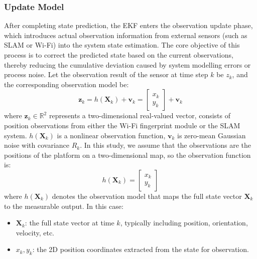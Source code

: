\documentclass[12pt,a4paper]{article}
\numberwithin{equation}{section}
\begin{document}
\subsubsection{Update Model}
After completing state prediction, the EKF enters the observation update phase,
which introduces actual observation information from external sensors (such as
SLAM or Wi-Fi) into the system state estimation. The core objective of this
process is to correct the predicted state based on the current observations,
thereby reducing the cumulative deviation caused by system modelling errors or
process noise. Let the observation result of the sensor at time step $k$ be
$z_k$, and the corresponding observation model be:
\begin{equation}
  \mathbf{z}_k = h(\mathbf{X}_k) + \mathbf{v}_k =
  \begin{bmatrix}
    x_k \\
    y_k
  \end{bmatrix} + \mathbf{v}_k
  \label{eq:observation_model}
\end{equation}
where \(\mathbf{z}_k \in \mathbb{R}^2\) represents a two-dimensional real-valued
vector, consists of position observations from either the Wi-Fi fingerprint
module or the SLAM system. $h(\mathbf{X}_k)$ is a nonlinear observation
function, $\mathbf{v}_k$ is zero-mean Gaussian noise with covariance $R_k$. In
this study, we assume that the observations are the positions of the platform on
a two-dimensional map, so the observation function is:
\begin{equation}
  h(\mathbf{X}_k) = 
  \begin{bmatrix}
    x_k \\
    y_k
  \end{bmatrix}
\end{equation}
\noindent
where $h(\mathbf{X}_k)$ denotes the observation model that maps the full state
vector $\mathbf{X}_k$ to the measurable output. In this case:
\begin{itemize}
\item $\mathbf{X}_k$: the full state vector at time $k$, typically including
  position, orientation, velocity, etc.
\item $x_k, y_k$: the 2D position coordinates extracted from the state for
  observation.
\end{itemize}
\end{document}
